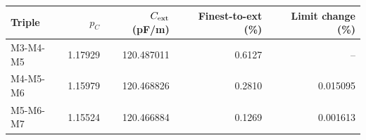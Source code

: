 \begin{tabular}{@{}lrrrr@{}}
\toprule
Triple & $p_C$ & $C_{\rm ext}$ (pF/m) & Finest-to-ext (\%) & Limit change (\%)\\
\midrule
M3-M4-M5 & 1.17929 & 120.487011 & 0.6127 & --\\
M4-M5-M6 & 1.15979 & 120.468826 & 0.2810 & 0.015095\\
M5-M6-M7 & 1.15524 & 120.466884 & 0.1269 & 0.001613\\
\bottomrule
\end{tabular}
